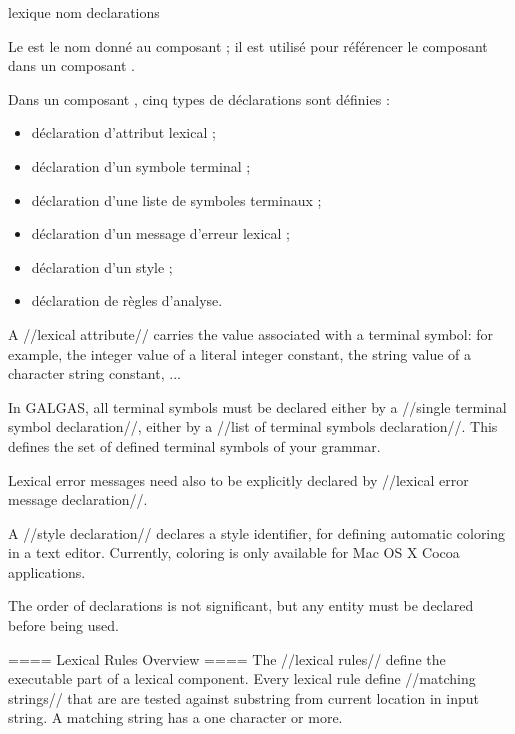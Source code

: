 {
\begin{galgascode}
lexique nom {
  declarations
}
\end{galgascode}

Le  est le nom donné au composant ; il est utilisé pour référencer le composant  dans un composant .


Dans un composant , cinq types de déclarations sont définies :
\begin{itemize}
  \item déclaration d'attribut lexical ;
  \item déclaration d'un symbole terminal ;
  \item déclaration d'une liste de symboles terminaux ;
  \item déclaration d'un message d'erreur lexical ;
  \item déclaration d'un style ;
  \item déclaration de règles d'analyse.
\end{itemize}

A //lexical attribute// carries the value associated with a terminal symbol: for example, the integer value of a literal integer constant, the string value of a character string constant, ...

In GALGAS, all terminal symbols must be declared either by a //single terminal symbol declaration//, either by a //list of terminal symbols declaration//. This defines the set of defined terminal symbols of your grammar.

Lexical error messages need also to be explicitly declared by //lexical error message declaration//. 

A //style declaration// declares a style identifier, for defining automatic coloring in a text editor. Currently, coloring is only available for Mac OS X Cocoa applications.

The order of declarations is not significant, but any entity must be declared before being used.

==== Lexical Rules Overview ====
The //lexical rules// define the executable part of a lexical component. Every lexical rule define //matching strings// that are are tested against substring from current location in input string. A matching string has a one character or more.

}
